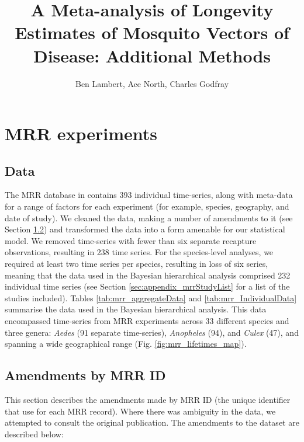 \documentclass[12pt]{article}
\title{A Meta-analysis of Longevity Estimates of Mosquito Vectors of Disease: Additional Methods}
\author{Ben Lambert, Ace North, Charles Godfray}
\begin{document}
\maketitle

\section{MRR experiments}
\subsection{Data}
The MRR database in \cite{guerra2014global} contains 393 individual time-series, along with meta-data for a range of factors for each experiment (for example, species, geography, and date of study). We  cleaned the data, making a number of amendments to it (see Section \ref{sec:amendments}) and transformed the data into a form amenable for our statistical model. We removed time-series with fewer than six separate recapture observations, resulting in 238 time series. For the species-level analyses, we required at least two time series per species, resulting in loss of six series, meaning that the data used in the Bayesian hierarchical analysis comprised 232 individual time series (see Section \ref{sec:appendix_mrrStudyList} for a list of the studies included). Tables \ref{tab:mrr_aggregateData} and \ref{tab:mrr_IndividualData} summarise the data used in the Bayesian hierarchical analysis. This data encompassed time-series from MRR experiments across 33 different species and three genera: \textit{Aedes} (91 separate time-series), \textit{Anopheles} (94), and \textit{Culex} (47), and spanning a wide geographical range (Fig. \ref{fig:mrr_lifetimes_map}).

\subsection{Amendments by MRR ID}\label{sec:amendments}
This section describes the amendments made by MRR ID (the unique identifier that \cite{guerra2014global} use for each MRR record). Where there was ambiguity in the data, we attempted to consult the original publication. The amendments to the dataset are described below:
\end{document}

